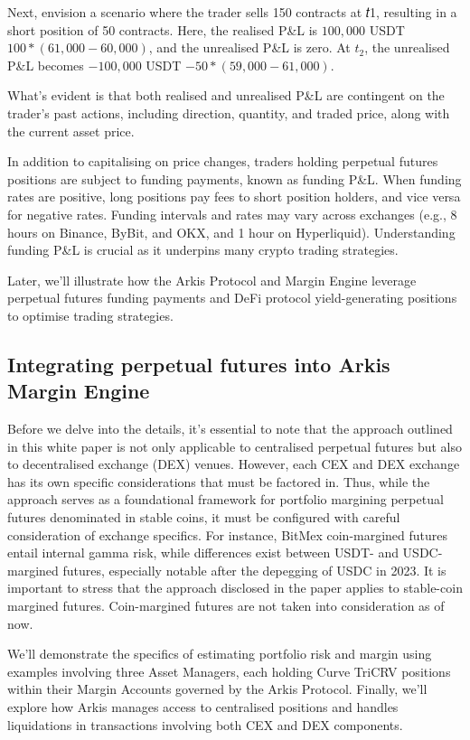 \documentclass[conference]{IEEEtran}
\begin{document}
Next, envision a scenario where the trader sells 150 contracts at 𝑡1, resulting in a short position of 50 contracts. Here, the realised P\&L is $100,000$ USDT $100 * (61,000 - 60,000)$, and the unrealised P\&L is zero. At $t_{2}$, the unrealised P\&L becomes $-100,000$ USDT $-50 * (59,000 - 61,000)$.

What’s evident is that both realised and unrealised P\&L are contingent on the trader's past actions, including direction, quantity, and traded price, along with the current asset price.

In addition to capitalising on price changes, traders holding perpetual futures positions are subject to funding payments, known as funding P\&L. When funding rates are positive, long positions pay fees to short position holders, and vice versa for negative rates. Funding intervals and rates may vary across exchanges (e.g., 8 hours on Binance, ByBit, and OKX, and 1 hour on Hyperliquid). Understanding funding P\&L is crucial as it underpins many crypto trading strategies.

Later, we'll illustrate how the Arkis Protocol and Margin Engine leverage perpetual futures funding payments and DeFi protocol yield-generating positions to optimise trading strategies.

\subsection{Integrating perpetual futures into Arkis Margin Engine}
Before we delve into the details, it's essential to note that the approach outlined in this white paper is not only applicable to centralised perpetual futures but also to decentralised exchange (DEX) venues. However, each CEX and DEX exchange has its own specific considerations that must be factored in. Thus, while the approach serves as a foundational framework for portfolio margining perpetual futures denominated in stable coins, it must be configured with careful consideration of exchange specifics. For instance, BitMex coin-margined futures entail internal gamma risk, while differences exist between USDT- and USDC-margined futures, especially notable after the depegging of USDC in 2023. It is important to stress that the approach disclosed in the paper applies to stable-coin margined futures. Coin-margined futures are not taken into consideration as of now.

We'll demonstrate the specifics of estimating portfolio risk and margin using examples involving three Asset Managers, each holding Curve TriCRV positions within their Margin Accounts governed by the Arkis Protocol. Finally, we'll explore how Arkis manages access to centralised positions and handles liquidations in transactions involving both CEX and DEX components.
\end{document}

